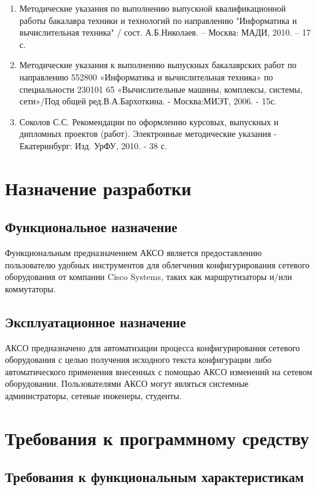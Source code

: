 \documentclass[a4paper,14pt]{extreport}
\begin{document}
	\begin{enumerate}
		\item  Методические указания по выполнению выпускной квалификационной работы бакалавра техники и технологий по направлению "Информатика и вычислительная техника" / сост. А.Б.Николаев. – Москва: МАДИ, 2010. – 17 с.
		\item Методические указания к выполнению выпускных бакалаврских работ по направлению 552800 «Информатика и вычислительная техника» по специальности 230101 65 «Вычислительные машины, комплексы, системы, сети»/Под общей ред.В.А.Бархоткина. - Москва:МИЭТ, 2006. - 15с.
		\item Соколов С.С. Рекомендации по оформлению курсовых, выпускных и дипломных проектов (работ). Электронные методические указания - Екатеринбург: Изд. УрФУ, 2010. - 38 с.
	\end{enumerate}
	
	
	\section{Назначение разработки}
	
	\subsection{Функциональное назначение}
	Функциональным предназначением АКСО является предоставлению пользователю удобных инструментов для облегчения конфигурирования сетевого оборудования от компании Cisco Systems, таких как маршрутизаторы и/или коммутаторы.
	
	\subsection{Эксплуатационное назначение}
	
	АКСО предназначено для автоматизации процесса конфигурирования сетевого оборудования с целью получения исходного текста конфигурации либо автоматического применения внесенных с помощью АКСО изменений на сетевом оборудовании. Пользователями АКСО могут являться системные администраторы, сетевые инженеры, студенты.
	
	\section{Требования к программному средству}
	
	\subsection{Требования к функциональным характеристикам}
	
\end{document}
